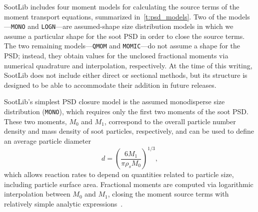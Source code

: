 \documentclass[preprint,letterpaper]{elsarticle}
\begin{document}
SootLib includes four moment models for calculating the source terms of the moment transport equations, summarized in~\ref{t:psd_models}. Two of the models---\texttt{MONO} and \texttt{LOGN}---are assumed-shape size distribution models in which we assume a particular shape for the soot PSD in order to close the source terms. The two remaining models---\texttt{QMOM} and \texttt{MOMIC}---do not assume a shape for the PSD; instead, they obtain values for the unclosed fractional moments via numerical quadrature and interpolation, respectively. At the time of this writing, SootLib does not include either direct or sectional methods, but its structure is designed to be able to accommodate their addition in future releases.

\begin{table}
    \caption{Summary of soot particle size distribution models implemented in SootLib.}
    \label{t:psd_models}
    \centering
\end{table}


SootLib's simplest PSD closure model is the assumed monodisperse size distribution (\texttt{MONO}), which requires only the first two moments of the soot PSD. These two moments, $M_0$ and $M_1$, correspond to the overall particle number density and mass density of soot particles, respectively, and can be used to define an average particle diameter
\begin{equation}
    d = \left( \frac{6M_1}{\pi \rho_s M_0} \right)^{1/3},
\end{equation}
which allows reaction rates to depend on quantities related to particle size, including particle surface area. Fractional moments are computed via logarithmic interpolation between $M_0$ and $M_1$, closing the moment source terms with relatively simple analytic expressions~\cite{Lignell_2008b}.
\end{document}
